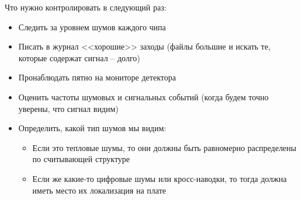 \documentclass[12pt]{article}
\begin{document}
Что нужно контролировать в следующий раз:
\begin{itemize}
	\item Следить за уровнем шумов каждого чипа
	\item Писать в журнал <<хорошие>> заходы (файлы большие и искать те, которые содержат сигнал -- долго)
	\item Пронаблюдать пятно на мониторе детектора
	\item Оценить частоты шумовых и сигнальных событий (когда будем точно уверены, что сигнал видим)
	\item Определить, какой тип шумов мы видим:
	\begin{itemize}
		\item Если это тепловые шумы, то они должны быть равномерно распределены по считывающей структуре
		\item Если же какие-то цифровые шумы или кросс-наводки, то тогда должна иметь место их локализация на плате
	\end{itemize}
\end{itemize}
\end{document}
